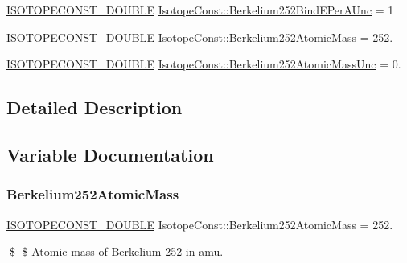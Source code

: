 \begin{DoxyCompactItemize}
\mbox{\hyperlink{group___isotope_const-_macros_ga8f45a7272ce02c0b4c65c44636ed719a}{I\+S\+O\+T\+O\+P\+E\+C\+O\+N\+S\+T\+\_\+\+D\+O\+U\+B\+LE}} \mbox{\hyperlink{group___isotope_const-_berkelium-_bk252_gaa4fb73274fc28f8727fcd7279e735779}{Isotope\+Const\+::\+Berkelium252\+Bind\+E\+Per\+A\+Unc}} = 1
\item 
\mbox{\hyperlink{group___isotope_const-_macros_ga8f45a7272ce02c0b4c65c44636ed719a}{I\+S\+O\+T\+O\+P\+E\+C\+O\+N\+S\+T\+\_\+\+D\+O\+U\+B\+LE}} \mbox{\hyperlink{group___isotope_const-_berkelium-_bk252_ga3267343376c4afb9ac40763aea893dd2}{Isotope\+Const\+::\+Berkelium252\+Atomic\+Mass}} = 252.
\item 
\mbox{\hyperlink{group___isotope_const-_macros_ga8f45a7272ce02c0b4c65c44636ed719a}{I\+S\+O\+T\+O\+P\+E\+C\+O\+N\+S\+T\+\_\+\+D\+O\+U\+B\+LE}} \mbox{\hyperlink{group___isotope_const-_berkelium-_bk252_gacced7026e737ec3c290fd3feec2a7183}{Isotope\+Const\+::\+Berkelium252\+Atomic\+Mass\+Unc}} = 0.
\end{DoxyCompactItemize}


\subsection{Detailed Description}


\subsection{Variable Documentation}
\mbox{\label{group___isotope_const-_berkelium-_bk252_ga3267343376c4afb9ac40763aea893dd2}} 
\subsubsection{\texorpdfstring{Berkelium252\+Atomic\+Mass}{Berkelium252AtomicMass}}
{\footnotesize\ttfamily \mbox{\hyperlink{group___isotope_const-_macros_ga8f45a7272ce02c0b4c65c44636ed719a}{I\+S\+O\+T\+O\+P\+E\+C\+O\+N\+S\+T\+\_\+\+D\+O\+U\+B\+LE}} Isotope\+Const\+::\+Berkelium252\+Atomic\+Mass = 252.}

\$ \$ Atomic mass of Berkelium-\/252 in amu. \mbox{\label{group___isotope_const-_berkelium-_bk252_gacced7026e737ec3c290fd3feec2a7183}} 
